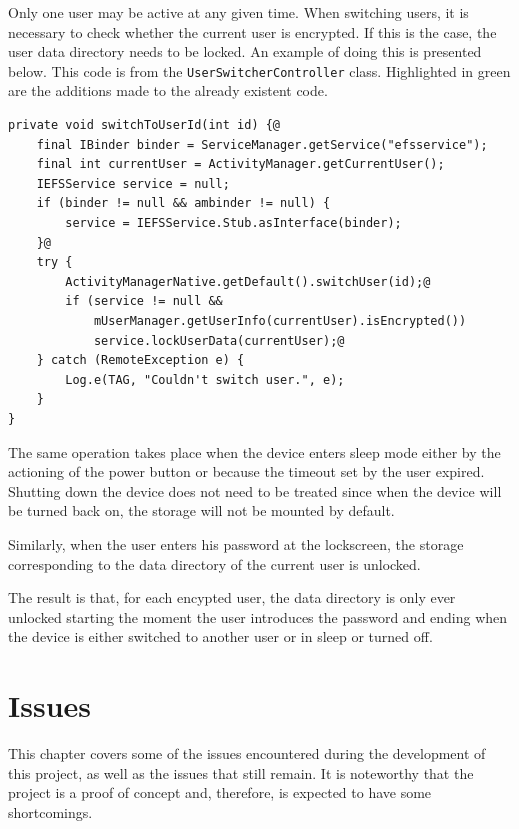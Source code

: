 Only one user may be active at any given time. When switching users, it is necessary to check whether the current user is encrypted. If this is the case, the user data directory needs to be locked. An example of doing this is presented below. This code is from the \texttt{UserSwitcherController} class. Highlighted in green are the additions made to the already existent code.


\begin{lstlisting}[style=custom]
private void switchToUserId(int id) {@
	final IBinder binder = ServiceManager.getService("efsservice");
	final int currentUser = ActivityManager.getCurrentUser();
	IEFSService service = null;
	if (binder != null && ambinder != null) {
		service = IEFSService.Stub.asInterface(binder);
	}@
	try {
		ActivityManagerNative.getDefault().switchUser(id);@
		if (service != null &&
		    mUserManager.getUserInfo(currentUser).isEncrypted())
			service.lockUserData(currentUser);@
	} catch (RemoteException e) {
		Log.e(TAG, "Couldn't switch user.", e);
	}
}
\end{lstlisting}

The same operation takes place when the device enters sleep mode either by the actioning of the power button or because the timeout set by the user expired. Shutting down the device does not need to be treated since when the device will be turned back on, the storage will not be mounted by default.

Similarly, when the user enters his password at the lockscreen, the storage corresponding to the data directory of the current user is unlocked.

The result is that, for each encypted user, the data directory is only ever unlocked starting the moment the user introduces the password and ending when the device is either switched to another user or in sleep or turned off.

\section{Issues}
\label{sec:issues-multi-user}

This chapter covers some of the issues encountered during the development of this project, as well as the issues that still remain. It is noteworthy that the project is a proof of concept and, therefore, is expected to have some shortcomings.

